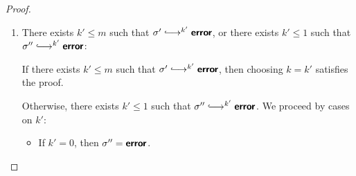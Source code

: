 \begin{proof}
\begin{enumerate}
\begin{itemize}
        
      \item If $j' = 1$:
        
        From $\conf'' \parstepsto \conf'''$ and $\conf''
        \parstepsto^{j'} \conf_c'$ and
        Lemma~\ref{lem:strong-local-quasi-confluence}, one of the
        following two cases is true:
        \begin{enumerate}
        \item There exist $\conf_c''$ and $i''$ and $j''$ such that
          $\conf'_c \parstepsto^{i''} \conf_c''$ and $\conf'''
          \parstepsto^{j''} \conf_c''$ and $i'' \leq 1$ and $j''
          \leq 1$.  So we also have $\conf' \parstepsto^{i'}
          \conf_c' \parstepsto^{i''} \conf_c''$.  In summary, we
          pick $\conf_c = \conf_c''$ and $i = i' + i''$ and $j =
          j''$, which is sufficient because $i = i' + i'' \leq m +
          1$ and $j = j'' \leq 1$.
        \item $\conf''' \parstepsto \error$ or $\conf'_c \parstepsto
          \error$.

          If $\conf''' \parstepsto \error$, then choosing $k = 1$
          satisfies the proof.

          Otherwise, $\conf'_c \parstepsto \error$, therefore $\conf'
          \parstepsto^{i'} \conf'_c \parstepsto \error$.

          Hence $\conf' \parstepsto^{i'+1} \error$.

          Since $i' \leq m$, we have that $i' + 1 \leq m + 1$, and
          so choosing $k = i' + 1$ satisfies the proof.
            
        \end{enumerate}

      \end{itemize}

    \item There exists $k' \leq m$ such that $\conf' \parstepsto^{k'}
      \error$, or there exists $k' \leq 1$ such that $\conf''
      \parstepsto^{k'} \error$:

      If there exists $k' \leq m$ such that $\conf' \parstepsto^{k'}
      \error$, then choosing $k = k'$ satisfies the proof.

      Otherwise, there exists $k' \leq 1$ such that $\conf''
      \parstepsto^{k'} \error$.  We proceed by cases on $k'$:

      \begin{itemize}

      \item If $k' = 0$, then $\sigma'' = \textbf{\textsf{error}}$.


\end{itemize}
\end{enumerate}
\end{proof}
